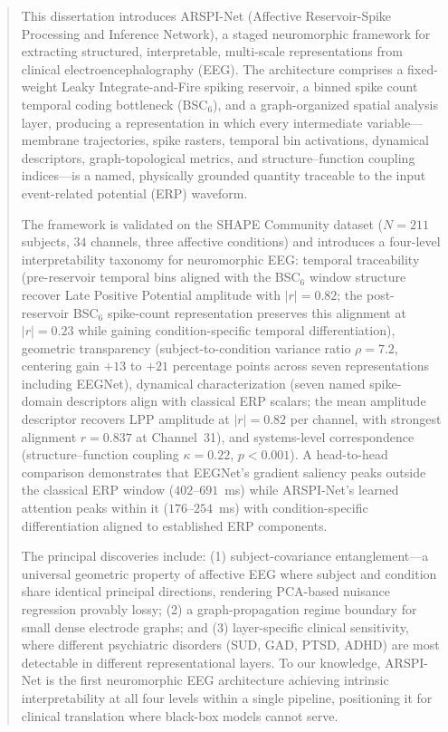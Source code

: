 \documentclass[12pt]{report}
\begin{document}
\begin{abstract}
This dissertation introduces ARSPI-Net (Affective Reservoir-Spike Processing and Inference Network), a staged neuromorphic framework for extracting structured, interpretable, multi-scale representations from clinical electroencephalography (EEG). The architecture comprises a fixed-weight Leaky Integrate-and-Fire spiking reservoir, a binned spike count temporal coding bottleneck (BSC$_6$), and a graph-organized spatial analysis layer, producing a representation in which every intermediate variable---membrane trajectories, spike rasters, temporal bin activations, dynamical descriptors, graph-topological metrics, and structure--function coupling indices---is a named, physically grounded quantity traceable to the input event-related potential (ERP) waveform.

The framework is validated on the SHAPE Community dataset ($N = 211$ subjects, $34$ channels, three affective conditions) and introduces a four-level interpretability taxonomy for neuromorphic EEG: temporal traceability (pre-reservoir temporal bins aligned with the BSC$_6$ window structure recover Late Positive Potential amplitude with $|r| = 0.82$; the post-reservoir BSC$_6$ spike-count representation preserves this alignment at $|r| = 0.23$ while gaining condition-specific temporal differentiation), geometric transparency (subject-to-condition variance ratio $\rho = 7.2$, centering gain $+13$ to $+21$ percentage points across seven representations including EEGNet), dynamical characterization (seven named spike-domain descriptors align with classical ERP scalars; the mean amplitude descriptor recovers LPP amplitude at $|r| = 0.82$ per channel, with strongest alignment $r = 0.837$ at Channel~31), and systems-level correspondence (structure--function coupling $\kappa = 0.22$, $p < 0.001$). A head-to-head comparison demonstrates that EEGNet's gradient saliency peaks outside the classical ERP window ($402$--$691$~ms) while ARSPI-Net's learned attention peaks within it ($176$--$254$~ms) with condition-specific differentiation aligned to established ERP components.

The principal discoveries include: (1) subject-covariance entanglement---a universal geometric property of affective EEG where subject and condition share identical principal directions, rendering PCA-based nuisance regression provably lossy; (2) a graph-propagation regime boundary for small dense electrode graphs; and (3) layer-specific clinical sensitivity, where different psychiatric disorders (SUD, GAD, PTSD, ADHD) are most detectable in different representational layers. To our knowledge, ARSPI-Net is the first neuromorphic EEG architecture achieving intrinsic interpretability at all four levels within a single pipeline, positioning it for clinical translation where black-box models cannot serve.
\end{abstract}
\end{document}
